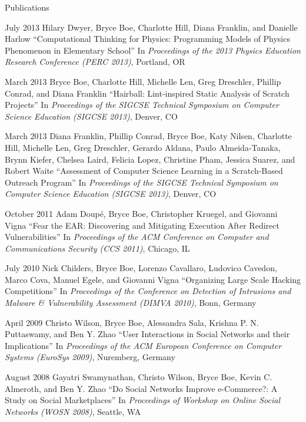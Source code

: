 \begin{vitae}
{\begin{vitaesection}{Publications}
  \item [July 2013] Hilary Dwyer, Bryce Boe, Charlotte Hill, Diana Franklin,
    and Danielle Harlow ``Computational Thinking for Physics: Programming
    Models of Physics Phenomenon in Elementary School'' In \emph{Proceedings of
      the 2013 Physics Education Research Conference (PERC 2013)}, Portland, OR
  \item [March 2013] Bryce Boe, Charlotte Hill, Michelle Len, Greg Dreschler,
    Phillip Conrad, and Diana Franklin ``Hairball: Lint-inspired Static
    Analysis of Scratch Projects'' In \emph{Proceedings of the  SIGCSE
      Technical Symposium on Computer Science Education (SIGCSE 2013)}, Denver,
    CO
  \item [March 2013] Diana Franklin, Phillip Conrad, Bryce Boe, Katy Nilsen,
    Charlotte Hill, Michelle Len, Greg Dreschler, Gerardo Aldana, Paulo
    Almeida-Tanaka, Brynn Kiefer, Chelsea Laird, Felicia Lopez, Christine Pham,
    Jessica Suarez, and Robert Waite ``Assessment of Computer Science Learning
    in a Scratch-Based Outreach Program'' In \emph{Proceedings of the 
      SIGCSE Technical Symposium on Computer Science Education (SIGCSE 2013)},
    Denver, CO
  \item [October 2011] Adam Doup\'e, Bryce Boe, Christopher Kruegel, and
    Giovanni Vigna ``Fear the EAR: Discovering and Mitigating Execution After
    Redirect Vulnerabilities'' In \emph{Proceedings of the  ACM
      Conference on Computer and Communications Security (CCS 2011)}, Chicago,
    IL
  \item [July 2010] Nick Childers, Bryce Boe, Lorenzo Cavallaro, Ludovico
    Cavedon, Marco Cova, Manuel Egele, and Giovanni Vigna ``Organizing Large
    Scale Hacking Competitions'' In \emph{Proceedings of the  Conference
      on Detection of Intrusions and Malware \& Vulnerability Assessment (DIMVA
      2010)}, Bonn, Germany
  \item [April 2009] Christo Wilson, Bryce Boe, Alessandra Sala, Krishna
    P. N. Puttaswamy, and Ben Y. Zhao ``User Interactions in Social Networks
    and their Implications'' In \emph{Proceedings of the  ACM European
      Conference on Computer Systems (EuroSys 2009)}, Nuremberg, Germany
  \item [August 2008] Gayatri Swamynathan, Christo Wilson, Bryce Boe, Kevin
    C. Almeroth, and Ben Y. Zhao ``Do Social Networks Improve e-Commerce?: A
    Study on Social Marketplaces'' In \emph{Proceedings of  Workshop on
      Online Social Networks (WOSN 2008)}, Seattle, WA
\end{vitaesection}

}
\end{vitae}
